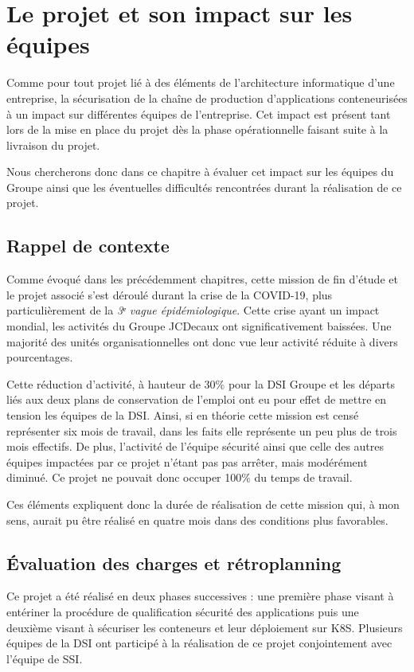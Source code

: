 \chapter{Le projet et son impact sur les équipes}
Comme pour tout projet lié à des éléments de l'architecture informatique d'une entreprise, la sécurisation de la chaîne
de production d'applications conteneurisées à un impact sur différentes équipes de l'entreprise. Cet impact est présent
tant lors de la mise en place du projet dès la phase opérationnelle faisant suite à la livraison du projet.

Nous chercherons donc dans ce chapitre à évaluer cet impact sur les équipes du Groupe ainsi que les éventuelles 
difficultés rencontrées durant la réalisation de ce projet.

\section{Rappel de contexte}
Comme évoqué dans les précédemment chapitres, cette mission de fin d'étude et le projet associé s'est déroulé
durant la crise de la COVID-19, plus particulièrement de la \textit{3ᵉ vague épidémiologique}. Cette crise ayant un 
impact mondial, les activités du Groupe JCDecaux ont significativement baissées. Une majorité des unités organisationnelles
ont donc vue leur activité réduite à divers pourcentages.

Cette réduction d'activité, à hauteur de 30\% pour la \ac{DSI} Groupe et les départs liés aux deux plans de conservation
de l'emploi ont eu pour effet de mettre en tension les équipes de la \ac{DSI}. Ainsi, si en théorie cette mission est
censé représenter six mois de travail, dans les faits elle représente un peu plus de trois mois effectifs.
\newline De plus, l'activité de l'équipe sécurité ainsi que celle des autres équipes impactées par ce projet n'étant pas 
pas arrêter, mais modérément diminué. Ce projet ne pouvait donc occuper 100\% du temps de travail.

Ces éléments expliquent donc la durée de réalisation de cette mission qui, à mon sens, aurait pu être réalisé en 
quatre mois dans des conditions plus favorables.

\section{Évaluation des charges et rétroplanning}
Ce projet a été réalisé en deux phases successives : une première phase visant à entériner la procédure de qualification 
sécurité des applications puis une deuxième visant à sécuriser les conteneurs et leur déploiement sur \ac{K8S}.
\newline Plusieurs équipes de la \ac{DSI} ont participé à la réalisation de ce projet conjointement avec l'équipe de 
\ac{SSI}.

